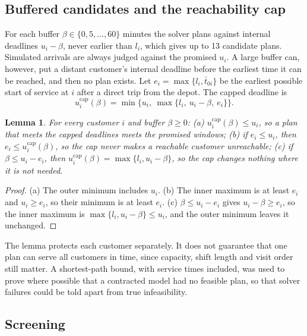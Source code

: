\documentclass[11pt,a4paper]{article}
\newtheorem{lemma}{Lemma}
\theoremstyle{remark}
\begin{document}
\subsection{Buffered candidates and the reachability cap}

For each buffer $\beta\in\{0,5,\ldots,60\}$ minutes the solver plans against
internal deadlines $u_i-\beta$, never earlier than $l_i$, which gives up to 13
candidate plans. Simulated arrivals are always judged against the promised $u_i$.
A large buffer can, however, put a distant customer's internal deadline before the
earliest time it can be reached, and then no plan exists. Let
$e_i=\max\{l_i,\bar t_{0i}\}$ be the earliest possible start of service at $i$
after a direct trip from the depot. The capped deadline is
\begin{equation}
 u_i^{\mathrm{cap}}(\beta)=\min\bigl\{u_i,\ \max\{l_i,\ u_i-\beta,\ e_i\}\bigr\}.
 \label{eq:cap}
\end{equation}

\begin{lemma}\label{lem:cap}
For every customer $i$ and buffer $\beta\ge0$: (a) $u_i^{\mathrm{cap}}(\beta)\le u_i$,
so a plan that meets the capped deadlines meets the promised windows; (b) if
$e_i\le u_i$, then $e_i\le u_i^{\mathrm{cap}}(\beta)$, so the cap never makes a
reachable customer unreachable; (c) if $\beta\le u_i-e_i$, then
$u_i^{\mathrm{cap}}(\beta)=\max\{l_i,u_i-\beta\}$, so the cap changes nothing where
it is not needed.
\end{lemma}

\begin{proof}
(a) The outer minimum includes $u_i$. (b) The inner maximum is at least $e_i$ and
$u_i\ge e_i$, so their minimum is at least $e_i$. (c) $\beta\le u_i-e_i$ gives
$u_i-\beta\ge e_i$, so the inner maximum is $\max\{l_i,u_i-\beta\}\le u_i$, and the
outer minimum leaves it unchanged.
\end{proof}

The lemma protects each customer separately. It does not guarantee that one plan
can serve all customers in time, since capacity, shift length and visit order still
matter. A shortest-path bound, with service times included, was used to prove
where possible that a contracted model had no feasible plan, so that solver
failures could be told apart from true infeasibility.

\subsection{Screening}
\end{document}
